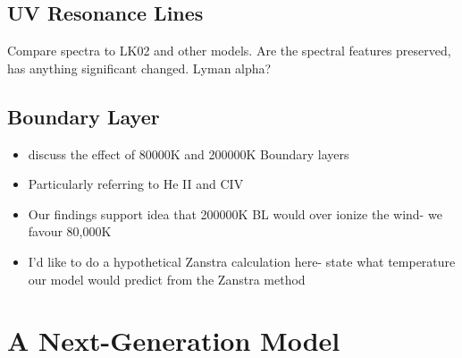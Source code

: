 \documentclass[preprint, a4paper, 11pt]{aastex}
\begin{document}
\subsection{UV Resonance Lines}
Compare spectra to LK02 and other models. Are the spectral features preserved, has anything significant changed.
Lyman alpha?



\subsection{Boundary Layer}
\begin{itemize}
\item discuss the effect of 80000K and 200000K Boundary layers
\item Particularly referring to He II and CIV
\item Our findings support idea that 200000K BL would over ionize the wind- 
we favour 80,000K
\item I'd like to do a hypothetical Zanstra calculation here- state what
temperature our model would predict from the Zanstra method
\end{itemize}



\newpage

%
%

\section{A Next-Generation Model}
\end{document}
